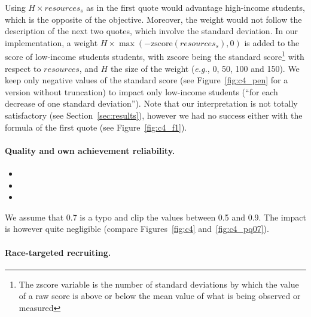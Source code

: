 Using $H \times resources_s$ as in the first quote would advantage high-income students, which is the opposite of the objective. Moreover, the weight would not follow the description of the next two quotes, which involve the standard deviation. In our implementation, a weight $H \times \max(-\mathrm{zscore}({resources}_s), 0)$ is added to the score of low-income students students, with $\mathrm{zscore}$ being the standard score\footnote{The zscore variable is the number of standard deviations by which the value of a raw score is above or below the mean value of what is being observed or measured} with respect to $resources$, and $H$ the size of the weight (\emph{e.g.}, 0, 50, 100 and 150).
We keep only negative values of the standard score (see Figure~\ref{fig:c4_pen} for a version without truncation) to impact only low-income students (``for each decrease of one standard
deviation'').
Note that our interpretation is not totally satisfactory (see Section~\ref{sec:results}), however we had no success either with the formula of the first quote (see Figure~\ref{fig:c4_f1}).

\paragraph{Quality and own achievement reliability.}

\begin{itemize}

\item{}

\item{}

\item{}

\end{itemize}

We assume that 0.7 is a typo and clip the values between 0.5 and 0.9. The impact is however quite negligible (compare  Figures~\ref{fig:c4} and~\ref{fig:c4_pq07}).

\paragraph{Race-targeted recruiting.}

